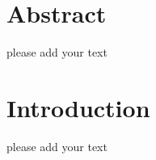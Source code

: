










\makeTitlePage
\newpage
\pagestyle{headings}
\chapter*{Abstract}   %
please add your text

\cleardoublepage
\tableofcontents
\cleardoublepage

\chapter{Introduction}

please add your text 



\theDeclaration

% 
% 

